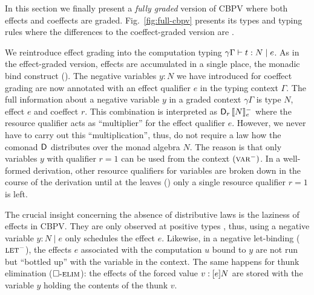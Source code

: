\documentclass[acmsmall,review,anonymous]{acmart}\settopmatter{printfolios=true,printccs=false,printacmref=false}
\newcommand{\graybox}[1]{\grayboxtext{$#1$}}
\begin{document}
In this section we finally present a \emph{fully graded} version of
CBPV where both effects and coeffects are graded.
Fig.~\ref{fig:full-cbpv} presents its types and typing rules where the
differences to the coeffect-graded version are
\graybox{\mbox{highlighted}}.

We reintroduce effect grading into the computation typing
$\qeCompTy \gamma \Gamma t e N$.  As in the effect-graded version,
effects are accumulated in a single place, the monadic bind construct
(\relim\diamond).  The negative variables $y : N$ we have introduced for
coeffect grading are now annotated with an effect qualifier $e$ in the
typing context $\Gamma$.  The full information about a negative
variable $y$ in a graded context $\gamma\Gamma$ is type $N$, effect
$e$ and coeffect $r$.  This combination is interpreted as
$\D[r]\,\Denn N e$ where the resource qualifier acts as ``multiplier''
for the effect qualifier $e$.  However, we never have to carry out
this ``multiplication'', thus, do not require a law how the comonad
$\D$ distributes over the monad algebra $N$.  The reason is that only
variables $y$ with qualifier $r=1$ can be used from the context $(\rvar^{-})$.
In a well-formed derivation, other resource qualifiers for variables are broken down
in the course of the derivation until at the leaves (\rvar) only a
single resource qualifier $r=1$ is left.

The crucial insight concerning the absence of distributive laws is the
laziness of effects in CBPV.  They are only observed at positive
types \citep{levy:hosc06},
thus, using a negative variable $y : N \mid e$ only schedules
the effect $e$.  Likewise, in a negative let-binding ($\rlet^{-}$),
the effects $e$ associated with the computation $u$ bound to $y$ are
not run but ``bottled up'' with the variable in the context.  The same
happens for thunk elimination ($\relim\Box$): the effects of the
forced value $v : \thunkty e N$ are stored with the variable $y$
holding the contents of the thunk $v$.
\end{document}
